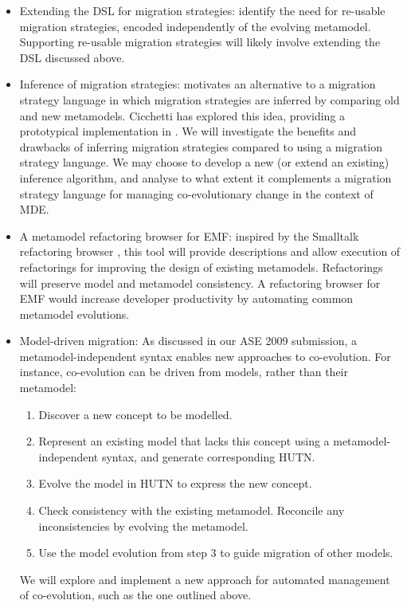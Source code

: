 \begin{itemize}
	\item Extending the DSL for migration strategies: \cite{herrmannsdoerfer08automatability} identify the need for re-usable migration strategies, encoded independently of the evolving metamodel. Supporting re-usable migration strategies will likely involve extending the DSL discussed above. 
	\item Inference of migration strategies: \cite{lerner00model} motivates an alternative to a migration strategy language in which migration strategies are inferred by comparing old and new metamodels. Cicchetti has explored this idea, providing a prototypical implementation in \cite{cicchetti08automating}. We will investigate the benefits and drawbacks of inferring migration strategies compared to using a migration strategy language. We may choose to develop a new (or extend an existing) inference algorithm, and analyse to what extent it complements a migration strategy language for managing co-evolutionary change in the context of MDE.
	\item A metamodel refactoring browser for EMF: inspired by the Smalltalk refactoring browser \cite{roberts97refactoring}, this tool will provide descriptions and allow execution of refactorings for improving the design of existing metamodels. Refactorings will preserve model and metamodel consistency. A refactoring browser for EMF would increase developer productivity by automating common metamodel evolutions.
	\item Model-driven migration: As discussed in our ASE 2009 submission, a metamodel-independent syntax enables new approaches to co-evolution. For instance, co-evolution can be driven from models, rather than their metamodel:
	\begin{enumerate}
		\item Discover a new concept to be modelled.
		\item Represent an existing model that lacks this concept using a metamodel-independent syntax, and generate corresponding HUTN.
		\item Evolve the model in HUTN to express the new concept.
		\item Check consistency with the existing metamodel. Reconcile any inconsistencies by evolving the metamodel.
		\item Use the model evolution from step 3 to guide migration of other models.
	\end{enumerate}
	We will explore and implement a new approach for automated management of co-evolution, such as the one outlined above.
\end{itemize}


